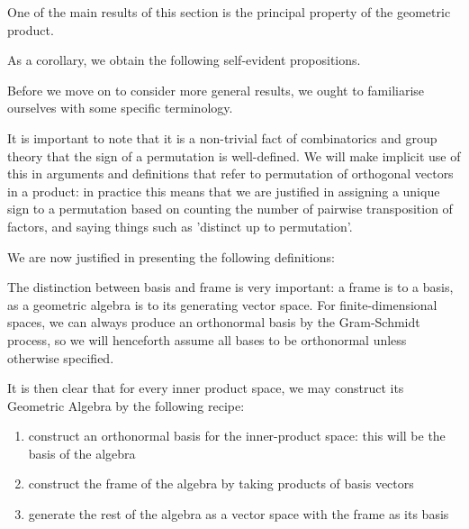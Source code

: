 One of the main results of this section is the principal property of the geometric product.



As a corollary, we obtain the following self-evident propositions.
%
%



Before we move on to consider more general results, we ought to familiarise ourselves with some specific terminology.


%
%



\begin{remark}
	It is important to note that it is a non-trivial fact of combinatorics and group theory that the sign of a permutation is well-defined. We will make implicit use of this in arguments and definitions that refer to permutation of orthogonal vectors in a product: in practice this means that we are justified in assigning a unique sign to a permutation based on counting the number of pairwise transposition of factors, and saying things such as 'distinct up to permutation'.
\end{remark}



We are now justified in presenting the following definitions:

%
%




The distinction between basis and frame is very important: a frame is to a basis, as a geometric algebra is to its generating vector space.
For finite-dimensional spaces, we can always produce an orthonormal basis by the Gram-Schmidt process, so we will henceforth assume all bases to be orthonormal unless otherwise specified.

It is then clear that for every inner product space, we may construct its Geometric Algebra by the following recipe:
\begin{enumerate}
	\item construct an orthonormal basis for the inner-product space: this will be the basis of the algebra
	\item construct the frame of the algebra by taking products of basis vectors
	\item generate the rest of the algebra as a vector space with the frame as its basis
\end{enumerate}

